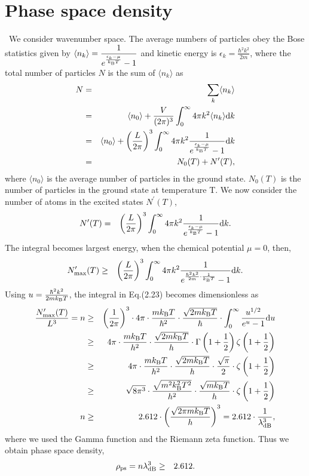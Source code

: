 \documentclass[12pt,a4paper]{report}
\newcommand{\diff}{\mathrm{d}}				            %
\newcommand{\kb} {k_{\rm B}}				            %
\begin{document}
\section{Phase space density}
\ We consider wavenumber space.
The average numbers of particles obey the Bose statistics given by
$\displaystyle \langle n_k \rangle = \frac{1}{e^{\frac{\epsilon_k - \mu}{\kb T}} - 1}$
and kinetic energy is $\displaystyle \epsilon_k = \frac{\hbar^2 k^2}{2 m}$,
 where the total number of particles $N$ is the sum of $\langle n_k \rangle$ as
\begin{eqnarray}
N & = & \sum_k \langle n_k \rangle
\\
& = & \langle n_0 \rangle  + \frac{V}{(2\pi)^3} \int_0^\infty 4 \pi k^2 \langle n_k \rangle \diff k  \nonumber
\\
& = & \langle n_0 \rangle + \left( \frac{L}{2\pi} \right)^3 \int_0^\infty 4 \pi k^2 \nonumber
\frac{1}{e^{\frac{\epsilon_k - \mu}{\kb T}} - 1} \diff k
\\
& = & N_0(T) + N^\prime(T),
\end{eqnarray}
where $\langle n_0 \rangle$ is the average number of particles in the ground state.
$N_0(T)$ is the number of particles in the ground state at temperature T.
We now consider the number of atoms in the excited states $N^\prime(T)$,
\begin{eqnarray}
N^\prime(T) & = & \left(\frac{L}{2 \pi}\right)^3 \int_0^\infty 4 \pi k^2 
 \frac{1}{e^{\frac{\epsilon_k - \mu}{\kb T}} - 1}  \diff k.
\end{eqnarray}
The integral becomes largest energy, when the chemical potential $\mu=0$, then,
\begin{eqnarray}
N^\prime_{{\rm max}}(T) & \ge & \left(\frac{L}{2 \pi}\right)^3 \int_0^\infty 4 \pi k^2 
 \frac{1}{e^{\frac{\hbar^2 k^2}{2 m} \cdot \frac{1}{\kb T}} - 1}  \diff k.
\end{eqnarray}
Using $u = \frac{\hbar^2 k^2}{2 m \kb T}$, the integral in Eq.(2.23) becomes dimensionless as
\begin{eqnarray}
\frac{N^\prime_{{\rm max}}(T)}{L^3} = n  & \ge & \left(\frac{1}{2 \pi} \right)^3 \cdot 
4 \pi \cdot \frac{m \kb T}{\hbar^2} \cdot \frac{\sqrt{2 m \kb T}}{\hbar} \cdot
\int_0^\infty \frac{u^{1/2}}{e^u - 1} \diff u
\\
& \ge & 4 \pi \cdot \frac{m \kb T}{h^2} \cdot \frac{\sqrt{2 m \kb T}}{h} \cdot \Gamma \left( 1+\frac{1}{2}\right) \zeta \left( 1+\frac{1}{2}\right)  \nonumber
\\
& \ge & 4 \pi \cdot \frac{m \kb T}{h^2} \cdot \frac{\sqrt{2 m \kb T}}{h} \cdot \frac{\sqrt{\pi}}{2}\cdot \zeta \left( 1+\frac{1}{2}\right) \nonumber
\\
& \ge & \sqrt{8 \pi^3} \cdot \frac{\sqrt{m^2 \kb^2 T^2}}{h^2} \cdot \frac{\sqrt{m \kb T}}{h} \cdot \zeta \left( 1+\frac{1}{2}\right) \nonumber
\\
n & \ge & 2.612 \cdot \left( \frac{\sqrt{2 \pi m \kb T}}{h} \right)^{3}
= 2.612 \cdot \frac{1}{\lambda_{{\rm dB}}^3},
\end{eqnarray}
where we used the Gamma function and the Riemann zeta function.
Thus we obtain phase space density,
\begin{eqnarray}
\rho_{{\rm ps}} = n \lambda_{{\rm dB}}^3 & \ge & 2.612.
\end{eqnarray}
\end{document}

